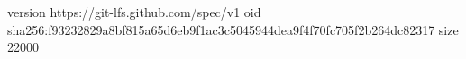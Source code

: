 version https://git-lfs.github.com/spec/v1
oid sha256:f93232829a8bf815a65d6eb9f1ac3c5045944dea9f4f70fc705f2b264dc82317
size 22000
